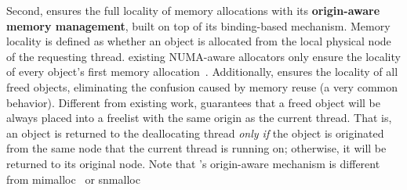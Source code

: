 Second, \NM{} ensures the full locality of memory allocations with its \textbf{origin-aware memory management},  built on top of its binding-based mechanism. Memory locality is defined as
whether an object is allocated from the local physical node of the requesting thread.  existing NUMA-aware allocators only ensure the locality of every object’s first memory allocation~\cite{tcmallocnuma, tcmalloc, yang2019jarena}. Additionally, \NM{} ensures the locality of all freed objects, eliminating the confusion caused by memory reuse (a very common behavior). Different from existing work, \NM{} guarantees that a freed object will be always placed into a freelist with the same origin as the current thread. That is, an object is returned to the deallocating thread \textit{only if} the object is originated from the same node that the current thread is running on; otherwise, it will be returned to its original node. 
Note that \NM{}'s origin-aware mechanism is different from mimalloc~\cite{mimalloc} or snmalloc~\cite{Snmalloc} 



